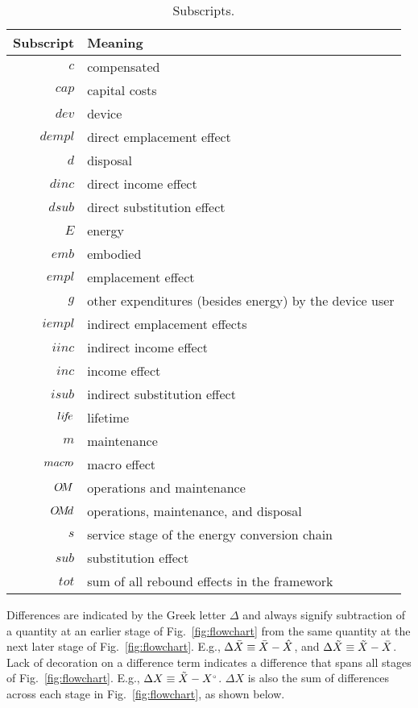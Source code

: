 
\begin{table}
\footnotesize
\centering
\caption{Subscripts.}
\begin{tabular}{r l}
  \toprule
  Subscript & Meaning \\
  \midrule
  $c$      & compensated \\
  $cap$    & capital costs \\
  $dev$    & device \\
  $dempl$  & direct emplacement effect \\
  $d$      & disposal \\
  $dinc$   & direct income effect \\
  $dsub$   & direct substitution effect \\
  $E$      & energy \\
  $emb$    & embodied \\
  $empl$   & emplacement effect \\
  $g$      & other expenditures (besides energy) by the device user \\
  $iempl$  & indirect emplacement effects \\
  $iinc$   & indirect income effect \\
  $inc$    & income effect \\
  $isub$   & indirect substitution effect \\
  $li\!f\!e$  & lifetime \\
  $m$      & maintenance \\
  $macr\!o$ & macro effect \\
  $O\!M$    & operations and maintenance \\
  $O\!M\!d$   & operations, maintenance, and disposal \\
  $s$      & service stage of the energy conversion chain \\
  $sub$    & substitution effect \\
  $tot$    & sum of all rebound effects in the framework \\
  \bottomrule
\end{tabular}
\label{tab:subscripts}
\end{table}


Differences are indicated by the Greek letter $\Delta$ and always
signify subtraction of a quantity at an earlier stage of Fig.~\ref{fig:flowchart}
from the same quantity at the next later stage of Fig.~\ref{fig:flowchart}.
E.g.,
$\Delta \bar{X} \equiv \bar{X} - \hat{X}$, and
$\Delta \tilde{X} \equiv \tilde{X} - \bar{X}$.
Lack of decoration on a difference term indicates a difference that spans all stages of Fig.~\ref{fig:flowchart}.
E.g., $\Delta X \equiv \tilde{X} - {}{X}^{\scriptscriptstyle \circ}$.
$\Delta X$ is also the sum of differences across each stage in Fig.~\ref{fig:flowchart},
as shown below.

